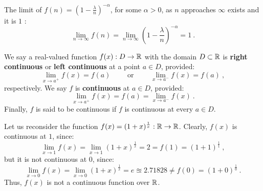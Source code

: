 \begin{example}\label{EX:Limit1MinusLambdaOverNToMinusK}
The limit of $f(n)=\left( 1-\frac{\lambda}{n} \right)^{-\alpha}$, for some $\alpha>0$, as $n$ approaches $\infty$ exists and it is $1$ :
\[
\lim_{n \to \infty} f(n) = \lim_{n \to \infty} \left( 1-\frac{\lambda}{n} \right)^{-\alpha} = 1 \ .
\]
\end{example}

\begin{definition}
We say a real-valued function $f(x):D \to \mathbb{R}$ with the domain $D \subset \mathbb{R}$ is {\bf right continuous} or {\bf left continuous} at a point $a \in D$, provided:
\[
\lim_{x \to a^+} f(x) = f(a) \qquad \text{ or } \qquad
\lim_{x \to a^-} f(x) = f(a) \ ,
\]
respectively.  We say $f$ is {\bf continuous} at $a \in D$, provided:
\[
\lim_{x \to a^+} f(x) = f(a) =
\lim_{x \to a^-} f(x) \ .
\]
Finally, $f$ is said to be continuous if $f$ is continuous at every $a \in D$.
\end{definition}
\begin{example}[Discontinuity of $f(x)=(1+x)^{\frac{1}{x}}$ at $0$]
Let us reconsider the function $f(x)=(1+x)^{\frac{1}{x}}:\mathbb{R} \to \mathbb{R}$.  Clearly, $f(x)$ is continuous at $1$, since:
\[
\lim_{x \to 1} f(x) = \lim_{x \to 1}(1+x)^{\frac{1}{x}} = 2 = f(1)=(1+1)^{\frac{1}{1}} \ ,
\]
but it is not continuous at $0$, since:
\[
\lim_{x \to 0} f(x) = \lim_{x \to 0} (1+x)^{\frac{1}{x}} = e \approxeq 2.71828 \neq f(0) = (1+0)^{\frac{1}{0}} \ .
\]
Thus, $f(x)$ is not a continuous function over $\mathbb{R}$.
\end{example}



